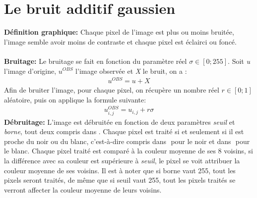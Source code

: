 \documentclass{article}
\begin{document}
	
	
		\newpage
		
		
	
		\section{Le bruit additif gaussien}
		\textbf{Définition graphique: }Chaque pixel de l'image est plus ou moins bruitée, l'image semble avoir moins de contraste et chaque pixel est éclairci ou foncé.\\\\
		\textbf{Bruitage: }Le bruitage se fait en fonction du paramètre réel \begin{math}\sigma\in[0;255]\end{math}. Soit \emph{u} l'image d'origine, \begin{math}u^{OBS}\end{math} l'image observée et \emph{X} le bruit, on a :
		\begin{align*}
			u^{OBS} = u + X
		\end{align*}
		Afin de bruiter l'image, pour chaque pixel, on récupère un nombre réel \begin{math}r \in [0;1]\end{math} aléatoire, puis on applique la formule suivante:
		\begin{align*}
			u^{OBS}_{i,j} = u_{i,j} + r\sigma
		\end{align*}
		\textbf{Débruitage: }L'image est débruitée en fonction de deux paramètres \emph{seuil} et \emph{borne}, tout deux compris dans \begin{math}[0;255]\end{math}. Chaque pixel est traité si et seulement si il est proche du noir ou du blanc, c'est-à-dire compris dans \begin{math}[0;borne]\end{math} pour le noir et dans \begin{math}[255-borne;255]\end{math} pour le blanc. Chaque pixel traité est comparé à la couleur moyenne de ses 8 voisins, si la différence avec sa couleur est supérieure à \emph{seuil}, le pixel se voit attribuer la couleur moyenne de ses voisins. Il est à noter que si borne vaut 255, tout les pixels seront traités, de même que si seuil vaut 255, tout les pixels traités se verront affecter la couleur moyenne de leurs voisins.\\\\
\end{document}
